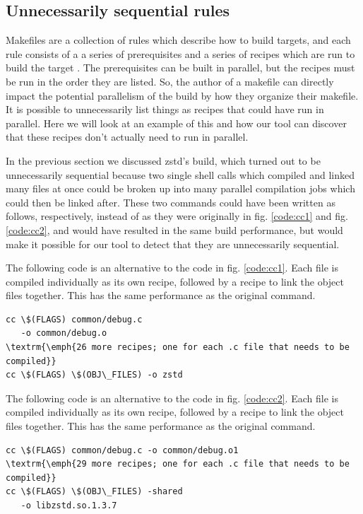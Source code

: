 \documentclass[sigconf,10pt,authorversion]{acmart}\settopmatter{printfolios=true,printccs=false,printacmref=false}
\begin{document}
\subsection{Unnecessarily sequential rules}
\label{sec:sequential}

Makefiles are a collection of rules which describe how to build targets,
and each rule consists
of a a series of prerequisites and a series of recipes which are run to build the target \cite{gnumakemanual}.  The
prerequisites can be built in parallel, but the recipes must be run in the order they are listed.  So,
the author of a makefile can directly impact the potential parallelism of the build by
how they organize their makefile.  It is possible to unnecessarily list things as recipes that
could have run in parallel.  Here we will look at an example of this and how our tool can
discover that these recipes don't actually need to run in parallel.

In the previous section we discussed zstd's build, which turned out to be unnecessarily sequential
because two single shell calls which compiled and linked many files at once could be broken up
into many parallel compilation jobs which could then be linked after.  These two commands could
have been written as follows, respectively, instead of as they were
originally in fig. \ref{code:cc1} and fig. \ref{code:cc2}, and would have resulted in the same
build performance, but would make it possible for our tool to detect that they are unnecessarily
sequential.

The following code is an alternative to the code in fig. \ref{code:cc1}. Each file is compiled individually
as its own recipe, followed by a recipe to link the object files together.  This has the same
performance as the original command.
  \begin{Verbatim}[commandchars=\\\{\},codes={\catcode`$=3\catcode`^=7\catcode`_=8},fontsize=\small]
cc \$(FLAGS) common/debug.c
   -o common/debug.o
\textrm{\emph{26 more recipes; one for each .c file that needs to be compiled}}
cc \$(FLAGS) \$(OBJ\_FILES) -o zstd
\end{Verbatim}
  
The following code is an alternative to the code in fig. \ref{code:cc2}. Each file is compiled individually
  as its own recipe, followed by a recipe to link the object files together.  This has the same
  performance as the original command.
  \begin{Verbatim}[commandchars=\\\{\},codes={\catcode`$=3\catcode`^=7\catcode`_=8},fontsize=\small]
cc \$(FLAGS) common/debug.c -o common/debug.o1
\textrm{\emph{29 more recipes; one for each .c file that needs to be compiled}}
cc \$(FLAGS) \$(OBJ\_FILES) -shared
   -o libzstd.so.1.3.7
\end{Verbatim}
\end{document}
